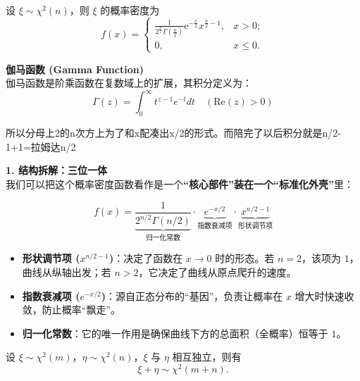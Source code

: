 \begin{theorem}
    设 $\xi \sim \chi^2(n)$，则 $\xi$ 的概率密度为
    \begin{equation}
        f(x) = \begin{cases}
            \frac{1}{2^{\frac{n}{2}}\Gamma\left(\frac{n}{2}\right)} \mathrm{e}^{-\frac{x}{2}} x^{\frac{n}{2}-1}, & x > 0; \\
            0, & x \le 0.
        \end{cases}
    \end{equation}
\end{theorem}
\textbf{伽马函数 (Gamma Function)} \\
伽马函数是阶乘函数在复数域上的扩展，其积分定义为：
\begin{equation}
    \Gamma(z) = \int_{0}^{\infty} t^{z-1} e^{-t} dt \quad (\text{Re}(z) > 0)
\end{equation}
\begin{dxtips}
    所以分母上2的n次方上为了和x配凑出x/2的形式。而陪完了以后积分就是n/2-1+1=拉姆达n/2
\end{dxtips}
\begin{note}
    \textbf{1. 结构拆解：三位一体} \\
我们可以把这个概率密度函数看作是一个\textbf{“核心部件”装在一个“标准化外壳”}里：

\begin{equation}
    f(x) = \underbrace{\frac{1}{2^{n/2} \Gamma(n/2)}}_{\text{归一化常数}} \cdot \underbrace{e^{-x/2}}_{\text{指数衰减项}} \cdot \underbrace{x^{n/2-1}}_{\text{形状调节项}}
\end{equation}

\begin{itemize}
    \item \textbf{形状调节项 ($x^{n/2-1}$)}：决定了函数在 $x \to 0$ 时的形态。若 $n = 2$，该项为 $1$，曲线从纵轴出发；若 $n > 2$，它决定了曲线从原点爬升的速度。
    \item \textbf{指数衰减项 ($e^{-x/2}$)}：源自正态分布的“基因”，负责让概率在 $x$ 增大时快速收敛，防止概率“飘走”。
    \item \textbf{归一化常数}：它的唯一作用是确保曲线下方的总面积（全概率）恒等于 $1$。
\end{itemize}
\begin{theorem}
设 $\xi \sim \chi^2(m)$，$\eta \sim \chi^2(n)$，$\xi$ 与 $\eta$ 相互独立，则有
\[
\xi + \eta \sim \chi^2(m+n).
\]
\end{theorem}
\end{note}
